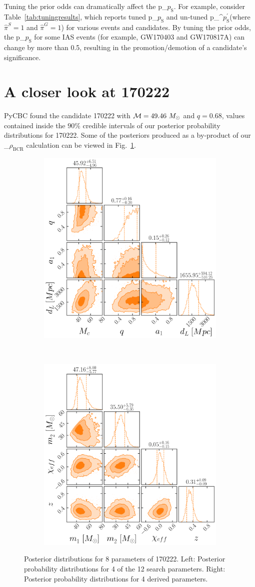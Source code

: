 \documentclass[useAMS,fleqn, usenatbib, final]{mnras}
\newcommand{\fancytext}[1]{{\relax\ifmmode#1\else $#1$\fi}\xspace}
\newcommand{\mathcmd}[1]{{\sc \relax\ifmmode#1\else $#1$\fi}\xspace}
\newcommand{\bcr}{\mathcmd{\rho_\text{BCR}}}
\newcommand{\msun}{\mathcmd{M_\odot}}
\newcommand{\pastrobcr}{\fancytext{p_\text{S}}}
\newcommand{\untunedpastrobcr}{\fancytext{p_\text{S}^{\prime}}}
\begin{document}
Tuning the prior odds can dramatically affect the \pastrobcr. For example, consider Table~\ref{tab:tuningresults}, which reports tuned \pastrobcr and un-tuned \untunedpastrobcr (where $\hat{\pi}^S=1$ and $\hat{\pi}^G=1$) for various events and candidates. By tuning the prior odds, the \pastrobcr for some IAS events (for example, GW170403 and GW170817A) can change by more than 0.5, resulting in the promotion/demotion of a candidate's significance.





\section{A closer look at 170222}\label{apdx:170222}
PyCBC found the candidate 170222 with $\mathcal{M}=49.46\ \msun$ and $q=0.68$, values contained inside the $90\%$ credible intervals of our posterior probability distributions for 170222. Some of the posteriors produced as a by-product of our \bcr calculation can be viewed in Fig.~\ref{fig:170222}.

\begin{figure}
    \centering
    \begin{subfigure}
        \centering
        \includegraphics[width=0.45\linewidth]{170222_prior_posterior.png}
    \end{subfigure}
    ~ 
    \begin{subfigure}
        \centering
        \includegraphics[width=0.45\linewidth]{170222_source_posterior.png}
    \end{subfigure}
    \caption{Posterior distributions for 8 parameters of 170222. 
    Left: Posterior probability distributions for 4 of the 12 search parameters.
    Right: Posterior probability distributions for 4 derived parameters.
    \label{fig:170222}}
\end{figure}





\bsp	%
\label{lastpage}
\end{document}
